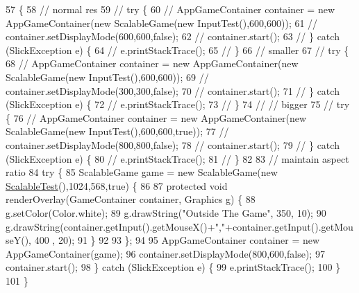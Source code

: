 \begin{DoxyCode}
57                                            \{
58         \textcolor{comment}{// normal res}
59 \textcolor{comment}{//      try \{}
60 \textcolor{comment}{//          AppGameContainer container = new AppGameContainer(new ScalableGame(new InputTest(),600,600));}
61 \textcolor{comment}{//          container.setDisplayMode(600,600,false);}
62 \textcolor{comment}{//          container.start();}
63 \textcolor{comment}{//      \} catch (SlickException e) \{}
64 \textcolor{comment}{//          e.printStackTrace();}
65 \textcolor{comment}{//      \}}
66         \textcolor{comment}{// smaller}
67 \textcolor{comment}{//      try \{}
68 \textcolor{comment}{//          AppGameContainer container = new AppGameContainer(new ScalableGame(new InputTest(),600,600));}
69 \textcolor{comment}{//          container.setDisplayMode(300,300,false);}
70 \textcolor{comment}{//          container.start();}
71 \textcolor{comment}{//      \} catch (SlickException e) \{}
72 \textcolor{comment}{//          e.printStackTrace();}
73 \textcolor{comment}{//      \}}
74 \textcolor{comment}{//      // bigger}
75 \textcolor{comment}{//      try \{}
76 \textcolor{comment}{//          AppGameContainer container = new AppGameContainer(new ScalableGame(new
       InputTest(),600,600,true));}
77 \textcolor{comment}{//          container.setDisplayMode(800,800,false);}
78 \textcolor{comment}{//          container.start();}
79 \textcolor{comment}{//      \} catch (SlickException e) \{}
80 \textcolor{comment}{//          e.printStackTrace();}
81 \textcolor{comment}{//      \}}
82 
83         \textcolor{comment}{// maintain aspect ratio}
84         \textcolor{keywordflow}{try} \{
85             ScalableGame game = \textcolor{keyword}{new} ScalableGame(\textcolor{keyword}{new} \mbox{\hyperlink{classorg_1_1newdawn_1_1slick_1_1tests_1_1_scalable_test_a9ca75a0468482f8eb516d1f4814f29f2}{ScalableTest}}(),1024,568,\textcolor{keyword}{true}) \{
86 
87                 \textcolor{keyword}{protected} \textcolor{keywordtype}{void} renderOverlay(GameContainer container, Graphics g) \{
88                     g.setColor(Color.white);
89                     g.drawString(\textcolor{stringliteral}{"Outside The Game"}, 350, 10);
90                     g.drawString(container.getInput().getMouseX()+\textcolor{stringliteral}{","}+container.getInput().getMouseY(), 400
      , 20);
91                 \}
92                 
93             \};
94             
95             AppGameContainer container = \textcolor{keyword}{new} AppGameContainer(game);
96             container.setDisplayMode(800,600,\textcolor{keyword}{false});
97             container.start();
98         \} \textcolor{keywordflow}{catch} (SlickException e) \{
99             e.printStackTrace();
100         \}
101     \}
\end{DoxyCode}
\mbox{\label{classorg_1_1newdawn_1_1slick_1_1tests_1_1_scalable_test_a56ccbb0f6633035a9901e9605e17b626}} 
